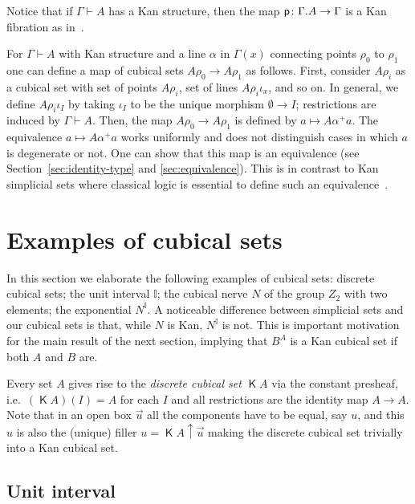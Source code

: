 \documentclass[a4paper,USenglish,draft]{lipics}
\newcommand{\pp}{{\sf p}}
\newcommand{\interval}{\mathbb{I}}
\DeclareMathOperator{\discr}{\mathsf{K}}
\newcommand{\es}{\emptyset}
\newcommand{\rup}[1]{#1{\uparrow}}
\begin{document}
Notice that if $\Gamma \vdash A$ has a Kan structure, then the map
$\pp \colon \Gamma.A \to \Gamma$ is a Kan fibration as in~\cite{Kan,
  Williamson}.

For $\Gamma \vdash A$ with Kan structure and a line $\alpha$ in
$\Gamma (x)$ connecting points $\rho_0$ to $\rho_1$ one can define a
map of cubical sets $A \rho_0 \to A \rho_1$ as follows.  First,
consider $A\rho_i$ as a cubical set with set of points $A\rho_i$, set
of lines $A\rho_i\iota_x$, and so on.  In general, we define
$A\rho_i\iota_I$ by taking $\iota_I$ to be the unique morphism $\es\to
I$; restrictions are induced by $\Gamma \vdash A$.  Then, the map $A
\rho_0 \to A \rho_1$ is defined by $a \mapsto A \alpha^+ a$.  The
equivalence $a \mapsto A \alpha^+ a$ works uniformly and does not
distinguish cases in which $a$ is degenerate or not.  One can show
that this map is an equivalence (see Section~\ref{sec:identity-type}
and \ref{sec:equivalence}).  This is in contrast to Kan simplicial
sets where classical logic is essential to define such an
equivalence~\cite{BC}.


\section{Examples of cubical sets}\label{sec:examples}
In this section we elaborate the following examples of cubical sets:
discrete cubical sets; the unit interval $\interval$; the cubical nerve
$N$ of the group $Z_2$ with two elements; the exponential
$N^\interval$.  A noticeable difference between simplicial sets and our
cubical sets is that, while $N$ is Kan, $N^\interval$ is not.  This is
important motivation for the main result of the next section, implying
that $B^A$ is a Kan cubical set if both $A$ and $B$ are.

Every set $A$ gives rise to the \emph{discrete cubical set} $\discr A$
via the constant presheaf, i.e.\ $(\discr A) (I) = A$ for each $I$ and
all restrictions are the identity map $A \to A$.  Note that in an open
box $\vec u$ all the components have to be equal, say $u$, and this
$u$ is also the (unique) filler $u = \rup {\discr A} {\vec u}$ making
the discrete cubical set trivially into a Kan cubical set.

\subsection{Unit interval}
\label{sec:unit-interval}
\end{document}

